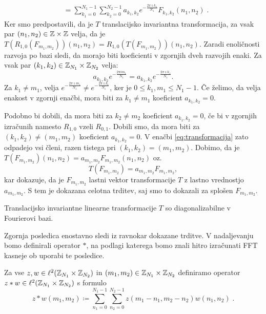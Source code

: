 \begin{dokaz}
\begin{align*}
& = \sum_{k_1=0}^{N_1-1} \sum_{k_2=0}^{N_2-1} a_{k_1, k_2} e^{-\frac{2\pi \imath k_1}{N_1}} F_{k_1, k_2}(n_1, n_2) \;.
\end{align*}
%
Ker smo predpostavili, da je $T$ translacijsko invariantna transformacija, za vsak par $(n_1, n_2) \in \mathbb Z \times \mathbb Z$ velja, da je $T(R_{1, 0} (F_{m_1, m_2}))(n_1, n_2) = R_{1, 0}(T(F_{m_1, m_2}))(n_1, n_2)$. Zaradi enoličnosti razvoja po bazi sledi, da morajo biti koeficienti v zgornjih dveh razvojih enaki. Za vsak par $(k_1, k_2) \in \mathbb Z_{N_1} \times \mathbb Z_{N_2}$ velja:
%
\begin{equation*}
a_{k_1, k_2} e^{-\frac{2\pi im_1}{N_1}} = a_{k_1, k_2} e^{-\frac{2\pi \imath k_1}{N_1}}.
\end{equation*} 
%
Za $k_1 \neq m_1$, velja $e^{-\frac{2\pi \imath m_1}{N_1}} \neq e^{-\frac{2\pi \imath k_1}{N_1}}$, ker je $0 \leq k_1, m_1 \leq N_1-1$. Če želimo, da velja enakost v zgornji enačbi, mora biti za $k_1 \neq m_1$ koeficient $a_{k_1, k_2} = 0$.

Podobno bi dobili, da mora biti za $k_2 \neq m_2$ koeficient $a_{k_1, k_2} = 0$, če bi v zgornjih izračunih namesto $R_{1, 0}$ vzeli $R_{0, 1}$. Dobili smo, da mora biti za $(k_1, k_2) \neq (m_1, m_2)$ koeficient $a_{k_1, k_2} = 0$. V enačbi \eqref{eq:transformacija} zato odpadejo vsi členi, razen tistega pri $(k_1, k_2) = (m_1, m_2)$. Dobimo, da je $T(F_{m_1, m_2})(n_1, n_2) = a_{m_1, m_2}F_{m_1, m_2}(n_1, n_2)$ oz.\ 
$$T(F_{m_1, m_2}) = a_{m_1, m_2}F_{m_1, m_2},$$
kar dokazuje, da je $F_{m_1, m_2}$ lastni vektor transformacije $T$ z lastno vrednostjo $a_{m_1, m_2}$. S tem je dokazana celotna trditev, saj smo to dokazali za splošen $F_{m_1, m_2}$.
\end{dokaz}
%
\begin{posledica}
Translacijsko invariantne linearne transformacije $T$ so dia\-go\-na\-li\-za\-bil\-ne v Fourierovi bazi.
\end{posledica}
%
Zgornja posledica enostavno sledi iz ravnokar dokazane trditve. V nadaljevanju bomo definirali operator $\ast$, na podlagi katerega bomo znali hitro izračunati FFT kasneje ob uporabi te posledice. %
%
\begin{definicija}
Za vse $z, w \in \ell^2(\mathbb Z_{N_1} \times \mathbb Z_{N_2})$ in $(m_1, m_2) \in \mathbb Z_{N_1} \times \mathbb Z_{N_2}$ definiramo operator $z \ast w \in \ell^2(\mathbb Z_{N_1} \times \mathbb Z_{N_2})$ s formulo
$$z \ast w(m_1, m_2) \coloneqq \sum_{n_1 = 0}^{N_1 - 1} \sum_{n_2 = 0}^{N_2 - 1} z(m_1 - n_1, m_2 - n_2)w(n_1, n_2) \;.$$
\end{definicija}
%
